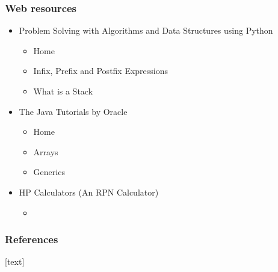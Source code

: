 \documentclass{beamer}
\begin{document}
\begin{frame}\frametitle{Web resources}
	\begin{itemize}

		\item 
		Problem Solving with Algorithms and Data Structures using Python
		\begin{itemize}
			
			\item 
			Home~\cite{pswads}
		
			\item 
			Infix, Prefix and Postfix Expressions~\cite{pswadsPostfix}
			
			\item
			What is a Stack~\cite{pswadsStack} 
			
		\end{itemize}

		\item 
		The Java Tutorials by Oracle
		\begin{itemize}
			
			\item 
			Home~\cite{TheJavaTutorials}
			
			\item
			Arrays~\cite{TheJavaTutorialsArray}
			
			\item
			Generics~\cite{TheJavaTutorialsGenerics}
			
		\end{itemize}
		
		\item
		HP Calculators (An RPN Calculator)
		\begin{itemize}
			
			\item 
		\end{itemize}
	\end{itemize}
\end{frame}



\begin{frame}[allowframebreaks]\frametitle{References}
	[text] %
%	
%	
%	
	
	\tiny %
	
\end{frame}

\end{document}
